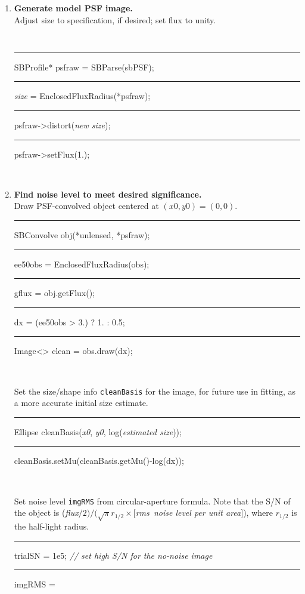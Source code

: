 \documentclass[useAMS,usenatbib,usegraphicx]{mn2e}
\begin{document}
\begin{enumerate}
\item {\bf Generate model PSF image.} \\ 
Adjust size to specification, if desired; set flux to unity. \\
\begin{boxit}
  {\tt 
    \rule{0.1in}{0in} SBProfile* psfraw = SBParse(sbPSF); \\
    \rule{0.1in}{0in} {\it size} = EnclosedFluxRadius(*psfraw); \\
    \rule{0.1in}{0in} psfraw->distort({\it new size}); \\
    \rule{0.1in}{0in} psfraw->setFlux(1.);} \\
\end{boxit}

\item {\bf Find noise level to meet desired significance.}  \\
Draw PSF-convolved object centered at $(x0, y0) = (0, 0)$. \\
\begin{boxit}
  {\tt \rule{0.1in}{0in} SBConvolve obj(*unlensed, *psfraw); \\
  \rule{0.1in}{0in} ee50obs = EnclosedFluxRadius(obs);\\
  \rule{0.1in}{0in} gflux = obj.getFlux(); \\
  \rule{0.1in}{0in} dx = (ee50obs > 3.) ? 1. : 0.5; \\
  \rule{0.1in}{0in} Image<> clean = obs.draw(dx);} \\
\end{boxit}
Set the size/shape info {\tt cleanBasis} for the image, for future use in fitting,
as a more accurate initial size estimate.\\ 
\begin{boxit}
  {\tt \rule{0.1in}{0in} Ellipse cleanBasis({\it x0}, {\it y0}, log({\it estimated size})); \\
  \rule{0.1in}{0in} cleanBasis.setMu(cleanBasis.getMu()-log(dx)); } \\
\end{boxit}
Set noise level {\tt imgRMS} from circular-aperture formula. 
Note that the S/N of the object is 
({\it flux}$/2)/(\sqrt{\pi}r_{1/2}\times[${\it rms~noise level per unit area}$]$), 
where $r_{1/2}$ is the half-light radius.\\
\begin{boxit}
  {\tt \rule{0.1in}{0in} trialSN = 1e5;    {\it // set high S/N for the no-noise image} \\
  \rule{0.1in}{0in} imgRMS = \\
}
\end{boxit}
\end{enumerate}
\end{document}
